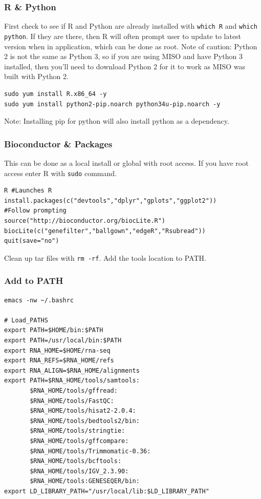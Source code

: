 \subsubsection*{R \& Python}
First check to see if R and Python are already installed with \texttt{which R} and \texttt{which python}. If they are there, then R will often prompt user to update to latest version when in application, which can be done as root. Note of caution: Python 2 is not the same as Python 3, so if you are using MISO and have Python 3 installed, then you'll need to download Python 2 for it to work as MISO was built with Python 2.

\begin{verbatim}
sudo yum install R.x86_64 -y
sudo yum install python2-pip.noarch python34u-pip.noarch -y
\end{verbatim}

Note: Installing pip for python will also install python as a dependency.

\subsubsection*{Bioconductor \& Packages}
This can be done as a local install or global with root access. If you have root access enter R with \texttt{sudo} command.

\begin{verbatim}
R #Launches R
install.packages(c("devtools","dplyr","gplots","ggplot2"))
#Follow prompting
source("http://bioconductor.org/biocLite.R")
biocLite(c("genefilter","ballgown","edgeR","Rsubread"))
quit(save="no")
\end{verbatim}

Clean up tar files with \texttt{rm -rf}. Add the tools location to PATH.
\subsubsection*{Add to PATH}
\begin{verbatim}
emacs -nw ~/.bashrc

# Load_PATHS                                                                                             
export PATH=$HOME/bin:$PATH
export PATH=/usr/local/bin:$PATH
export RNA_HOME=$HOME/rna-seq
export RNA_REFS=$RNA_HOME/refs
export RNA_ALIGN=$RNA_HOME/alignments
export PATH=$RNA_HOME/tools/samtools:
       $RNA_HOME/tools/gffread:
       $RNA_HOME/tools/FastQC:
       $RNA_HOME/tools/hisat2-2.0.4:
       $RNA_HOME/tools/bedtools2/bin:
       $RNA_HOME/tools/stringtie:
       $RNA_HOME/tools/gffcompare:
       $RNA_HOME/tools/Trimmomatic-0.36:
       $RNA_HOME/tools/bcftools:
       $RNA_HOME/tools/IGV_2.3.90:
       $RNA_HOME/tools:GENESEQER/bin:
export LD_LIBRARY_PATH="/usr/local/lib:$LD_LIBRARY_PATH"
\end{verbatim}

